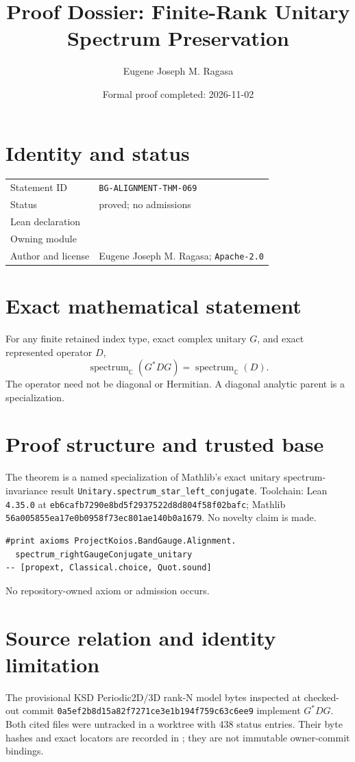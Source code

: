 \documentclass[10pt]{article}
\title{Proof Dossier: Finite-Rank Unitary Spectrum Preservation}
\author{Eugene Joseph M. Ragasa}
\date{Formal proof completed: 2026-11-02}
\begin{document}
\raggedright
\maketitle

\section{Identity and status}
\begin{tabularx}{\textwidth}{@{}lY@{}}
\toprule
Statement ID & \texttt{BG-ALIGNMENT-THM-069} \\
Status & proved; no admissions \\
Lean declaration &  \\
Owning module &  \\
Author and license & Eugene Joseph M. Ragasa; \texttt{Apache-2.0} \\
\bottomrule
\end{tabularx}

\section{Exact mathematical statement}
For any finite retained index type, exact complex unitary $G$, and exact represented operator $D$,
\[
 \operatorname{spectrum}_{\mathbb C}(G^*DG)
 =\operatorname{spectrum}_{\mathbb C}(D).
\]
The operator need not be diagonal or Hermitian. A diagonal analytic parent is a specialization.

\section{Proof structure and trusted base}
The theorem is a named specialization of Mathlib's exact unitary spectrum-invariance result
\texttt{Unitary.spectrum\_star\_left\_conjugate}. Toolchain: Lean \texttt{4.35.0} at
\texttt{eb6cafb7290e8bd5f2937522d8d804f58f02bafc}; Mathlib
\texttt{56a005855ea17e0b0958f73ec801ae140b0a1679}. No novelty claim is made.
\begin{verbatim}
#print axioms ProjectKoios.BandGauge.Alignment.
  spectrum_rightGaugeConjugate_unitary
-- [propext, Classical.choice, Quot.sound]
\end{verbatim}
No repository-owned axiom or admission occurs.

\section{Source relation and identity limitation}
The provisional KSD Periodic2D/3D rank-N model bytes inspected at checked-out commit
\texttt{0a5ef2b8d15a82f7271ce3e1b194f759c63c6ee9} implement $G^*DG$. Both cited files were
untracked in a worktree with 438 status entries. Their byte hashes and exact locators are recorded
in ; they are not immutable owner-commit bindings.
\end{document}
